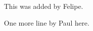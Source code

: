\documentclass{ximera}
\begin{document}
%
%
%
%
%
%
%
%
%
%
%

This was added by Felipe.

One more line by Paul here.
\end{document}
